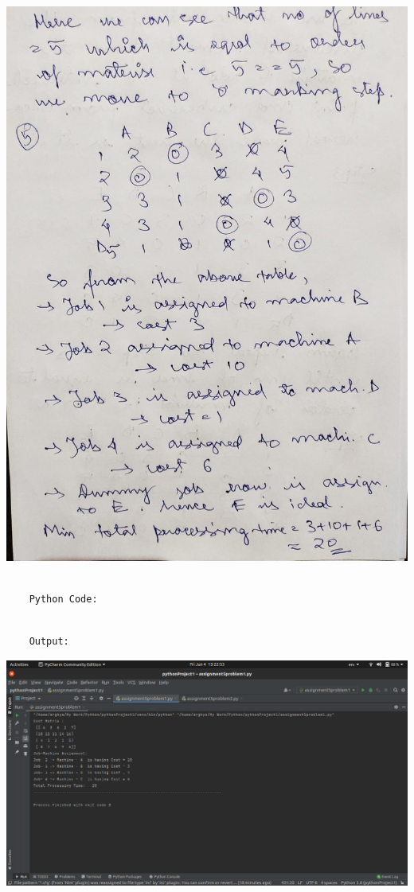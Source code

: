 \documentclass[12pt, letterpaper, twoside]{book}
\begin{document}
\includegraphics[width=\paperwidth, height=\paperheight]{Page6}
\begin{lstlisting}

	Python Code:

\end{lstlisting}

\pagebreak
\begin{lstlisting}

	Output:

\end{lstlisting}

\includegraphics[width=550pt]{Output1}
\pagebreak
\end{document}
